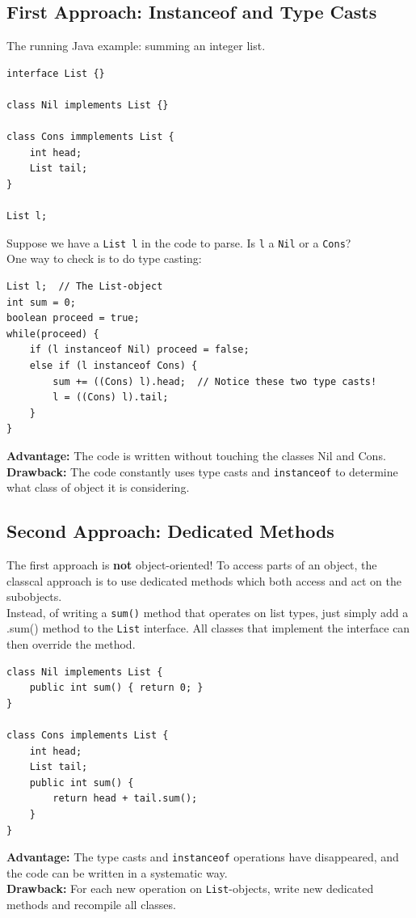 \documentclass[10pt]{article}
\begin{document}
\subsection*{First Approach: Instanceof and Type Casts}
The running Java example: summing an integer list.
\begin{verbatim}
interface List {}

class Nil implements List {}

class Cons immplements List {
    int head;
    List tail;
}

List l;
\end{verbatim}
Suppose we have a \texttt{List l} in the code to parse.  Is \texttt{l} a \texttt{Nil} or a \texttt{Cons}?  \\
One way to check is to do type casting:
\begin{verbatim}
List l;  // The List-object
int sum = 0;
boolean proceed = true;
while(proceed) {
    if (l instanceof Nil) proceed = false;
    else if (l instanceof Cons) {
        sum += ((Cons) l).head;  // Notice these two type casts!
        l = ((Cons) l).tail;
    }
}
\end{verbatim}
\textbf{Advantage:} The code is written without touching the classes Nil and Cons.\\
\textbf{Drawback:} The code constantly uses type casts and \texttt{instanceof} to determine what class of object it is considering.\\

\subsection*{Second Approach: Dedicated Methods}
The first approach is \textbf{not} object-oriented!  To access parts of an object, the classcal approach is to use dedicated methods which both access and act on the subobjects.\\
Instead, of writing a \texttt{sum()} method that operates on list types, just simply add a .sum() method to the \texttt{List} interface.  All classes that implement the interface can then override the method.

\begin{verbatim}
class Nil implements List {
    public int sum() { return 0; }
}

class Cons implements List {
    int head;
    List tail;
    public int sum() {
        return head + tail.sum();
    }
}
\end{verbatim}
\textbf{Advantage:} The type casts and \texttt{instanceof} operations have disappeared, and the code can be written in a systematic way.\\
\textbf{Drawback:} For each new operation on \texttt{List}-objects, write new dedicated methods and recompile all classes.
\end{document}
